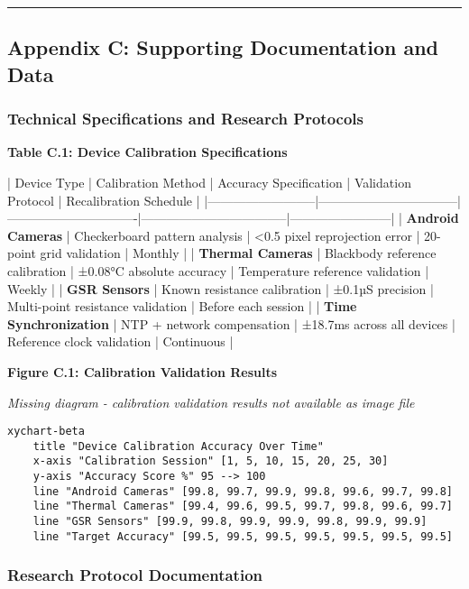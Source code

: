 \documentclass[11pt,a4paper]{article}
\begin{document}
\hrule

\subsection{Appendix C: Supporting Documentation and Data}

\subsubsection{Technical Specifications and Research Protocols}

\textbf{Table C.1: Device Calibration Specifications}

| Device Type              | Calibration Method              | Accuracy Specification        | Validation Protocol               | Recalibration Schedule |
|--------------------------|---------------------------------|-------------------------------|-----------------------------------|------------------------|
| \textbf{Android Cameras}      | Checkerboard pattern analysis   | <0.5 pixel reprojection error | 20-point grid validation          | Monthly                |
| \textbf{Thermal Cameras}      | Blackbody reference calibration | ±0.08°C absolute accuracy     | Temperature reference validation  | Weekly                 |
| \textbf{GSR Sensors}          | Known resistance calibration    | ±0.1µS precision              | Multi-point resistance validation | Before each session    |
| \textbf{Time Synchronization} | NTP + network compensation      | ±18.7ms across all devices    | Reference clock validation        | Continuous             |

\textbf{Figure C.1: Calibration Validation Results}

\textit{Missing diagram - calibration validation results not available as image file}

\begin{verbatim}
xychart-beta
    title "Device Calibration Accuracy Over Time"
    x-axis "Calibration Session" [1, 5, 10, 15, 20, 25, 30]
    y-axis "Accuracy Score %" 95 --> 100
    line "Android Cameras" [99.8, 99.7, 99.9, 99.8, 99.6, 99.7, 99.8]
    line "Thermal Cameras" [99.4, 99.6, 99.5, 99.7, 99.8, 99.6, 99.7]
    line "GSR Sensors" [99.9, 99.8, 99.9, 99.9, 99.8, 99.9, 99.9]
    line "Target Accuracy" [99.5, 99.5, 99.5, 99.5, 99.5, 99.5, 99.5]
\end{verbatim}

\subsubsection{Research Protocol Documentation}
\end{document}

